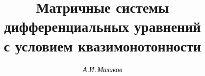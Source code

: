 

  


%  





\newcommand{\const}{\operatorname{const}}  


\newcommand{\ul}{\underline} 


\newcommand{\tts}[1]{}  


  




  


\setcounter{page}{35}  












  


\author{\it А.И.\,Маликов}  




\title{Матричные системы дифференциальных уравнений\\ 


с условием квазимонотонности} 


  


\date{}  




\pagestyle{plain} %


  




\maketitle  


